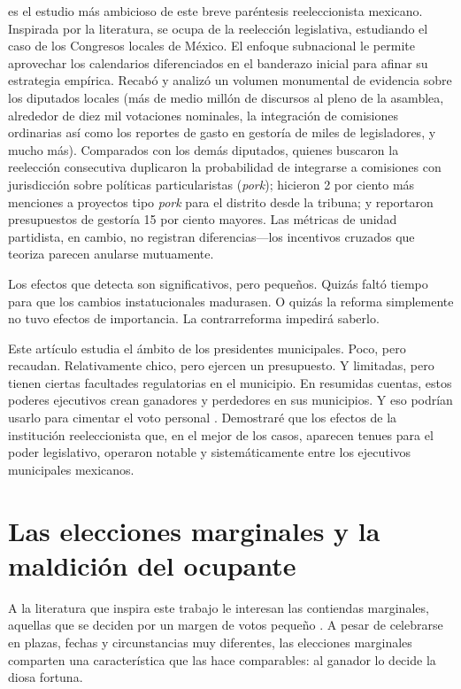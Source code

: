 \documentclass[letter,12pt]{article}
\begin{document}
\citet{motolinia-reel-book2026} es el estudio más ambicioso de este breve paréntesis reeleccionista mexicano. Inspirada por la literatura, se ocupa de la reelección legislativa, estudiando el caso de los Congresos locales de México. El enfoque subnacional le permite aprovechar los calendarios diferenciados en el banderazo inicial para afinar su estrategia empírica. Recabó y analizó un volumen monumental de evidencia sobre los diputados locales (más de medio millón de discursos al pleno de la asamblea, alrededor de diez mil votaciones nominales, la integración de comisiones ordinarias así como los reportes de gasto en gestoría de miles de legisladores, y mucho más). Comparados con los demás diputados, quienes buscaron la reelección consecutiva duplicaron la probabilidad de integrarse a comisiones con jurisdicción sobre políticas particularistas (\emph{pork}); hicieron 2 por ciento más menciones a proyectos tipo \emph{pork} para el distrito desde la tribuna; y reportaron presupuestos de gestoría 15 por ciento mayores. Las métricas de unidad partidista, en cambio, no registran diferencias---los incentivos cruzados que teoriza parecen anularse mutuamente. 

Los efectos que detecta son significativos, pero pequeños. Quizás faltó tiempo para que los cambios instatucionales madurasen. O quizás la reforma simplemente no tuvo efectos de importancia. La contrarreforma impedirá saberlo.

Este artículo estudia el ámbito de los presidentes municipales. Poco, pero recaudan. Relativamente chico, pero ejercen un presupuesto. Y limitadas, pero tienen ciertas facultades regulatorias en el municipio. En resumidas cuentas, estos poderes ejecutivos crean ganadores y perdedores en sus municipios. Y eso podrían usarlo para cimentar el voto personal \citep{cain.etal.1987,carey.shugart.1995}. Demostraré que los efectos de la institución reeleccionista que, en el mejor de los casos, aparecen tenues para el poder legislativo, operaron notable y sistemáticamente entre los ejecutivos municipales mexicanos. 

\section{Las elecciones marginales y la maldición del ocupante}

A la literatura que inspira este trabajo le interesan las contiendas marginales, aquellas que se deciden por un margen de votos pequeño \citep{mayhew1974vanishingMg,cox.1999}. A pesar de celebrarse en plazas, fechas y circunstancias muy diferentes, las elecciones marginales comparten una característica que las hace comparables: al ganador lo decide la diosa fortuna.
\end{document}
